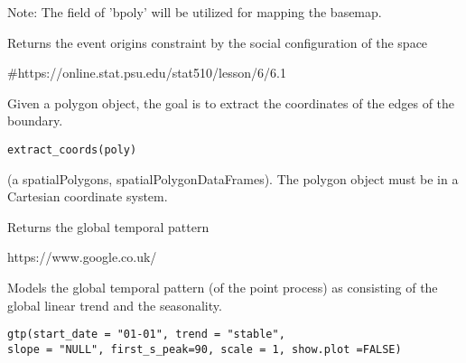 \documentclass[a4paper]{book}
\begin{document}
%
\begin{Details}\relax
Note: The  field of 'bpoly'
will be utilized for mapping the basemap.
\end{Details}
%
\begin{Value}
Returns the event origins constraint by the
social configuration of the space
\end{Value}
%
\begin{References}\relax
\#https://online.stat.psu.edu/stat510/lesson/6/6.1
\end{References}
%
\begin{Description}\relax
Given a polygon object, the goal is to extract
the coordinates of the edges of the boundary.
\end{Description}
%
\begin{Usage}
\begin{verbatim}
extract_coords(poly)
\end{verbatim}
\end{Usage}
%
\begin{Arguments}
\begin{ldescription}
\item[\code{poly}] (a spatialPolygons, spatialPolygonDataFrames).
The polygon object must be in a
Cartesian coordinate system.
\end{ldescription}
\end{Arguments}
%
\begin{Value}
Returns the global temporal pattern
\end{Value}
%
\begin{References}\relax
https://www.google.co.uk/
\end{References}
%
\begin{Description}\relax
Models the global temporal pattern (of
the point process) as consisting of the global linear
trend and the seasonality.
\end{Description}
%
\begin{Usage}
\begin{verbatim}
gtp(start_date = "01-01", trend = "stable",
slope = "NULL", first_s_peak=90, scale = 1, show.plot =FALSE)
\end{verbatim}
\end{Usage}
%
\end{document}
